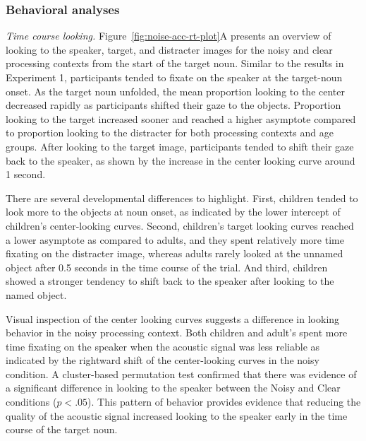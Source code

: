 \documentclass[,man,floatsintext]{apa6}
\begin{document}
\hypertarget{behavioral-analyses-1}{%
\subsubsection{Behavioral analyses}\label{behavioral-analyses-1}}

\emph{Time course looking.} Figure~\ref{fig:noise-acc-rt-plot}A presents an overview of looking to the speaker, target, and distracter images for the noisy and clear processing contexts from the start of the target noun. Similar to the results in Experiment 1, participants tended to fixate on the speaker at the target-noun onset. As the target noun unfolded, the mean proportion looking to the center decreased rapidly as participants shifted their gaze to the objects. Proportion looking to the target increased sooner and reached a higher asymptote compared to proportion looking to the distracter for both processing contexts and age groups. After looking to the target image, participants tended to shift their gaze back to the speaker, as shown by the increase in the center looking curve around 1 second.

There are several developmental differences to highlight. First, children tended to look more to the objects at noun onset, as indicated by the lower intercept of children's center-looking curves. Second, children's target looking curves reached a lower asymptote as compared to adults, and they spent relatively more time fixating on the distracter image, whereas adults rarely looked at the unnamed object after 0.5 seconds in the time course of the trial. And third, children showed a stronger tendency to shift back to the speaker after looking to the named object.

Visual inspection of the center looking curves suggests a difference in looking behavior in the noisy processing context. Both children and adult's spent more time fixating on the speaker when the acoustic signal was less reliable as indicated by the rightward shift of the center-looking curves in the noisy condition. A cluster-based permutation test confirmed that there was evidence of a significant difference in looking to the speaker between the Noisy and Clear conditions (\(p < .05\)). This pattern of behavior provides evidence that reducing the quality of the acoustic signal increased looking to the speaker early in the time course of the target noun.
\end{document}

